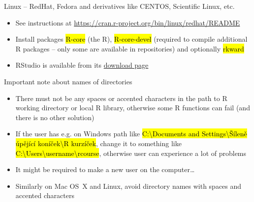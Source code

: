 \documentclass[compress, ucs, xelatex, 11pt, xcolor=svgnames,
  hyperref={
    bookmarks=true,
    unicode=true,
    colorlinks=true,
    pdftitle={Molecular data in R},
    plainpages=false,
    pdfauthor={Vojtech Zeisek},
    pdfsubject={Course about phylogeny and evolution in R},
    pdfcreator={XeLaTeX},
    pdfkeywords={R, evolution, phylogeny, molecular data},
    linkcolor=Tomato,
    anchorcolor=SaddleBrown,
    citecolor=Goldenrod,
    filecolor=DarkMagenta,
    menucolor=Sienna,
    urlcolor=DarkTurquoise,
    pdftex},
  url={hyphens, lowtilde} %
  ]{beamer}
\renewcommand{\texttt}[1]{\hl{\ttfamily #1}}
\begin{document}
\begin{frame}{Linux -- RedHat, Fedora and derivatives like CENTOS, Scientific Linux, etc.}
  \begin{itemize}
    \item See instructions at \url{https://cran.r-project.org/bin/linux/redhat/README}
    \item Install packages \texttt{R-core} (the R), \texttt{R-core-devel} (required to compile additional R packages -- only some are available in repositories) and optionally \texttt{rkward}
    \item RStudio is available from its \href{https://www.rstudio.com/products/rstudio/download/\#download}{download page}
  \end{itemize}
\end{frame}

\begin{frame}{Important note about names of directories}
  \begin{itemize}
    \item \alert{There must not be any spaces or accented characters in the path to R working directory or local R library}, otherwise some R functions can fail (and there is no other solution)
    \item If the user has e.g. on Windows path like \texttt{C:\textbackslash Documents and Settings\textbackslash Šíleně úpějící koníček\textbackslash R kurzíček}, change it to something like \texttt{C:\textbackslash Users\textbackslash username\textbackslash rcourse}, otherwise user can experience a lot of problems
    \item It might be required to make a new user on the computer\ldots
    \item Similarly on Mac OS~X and Linux, avoid directory names with spaces and accented characters
  \end{itemize}
\end{frame}
\end{document}
